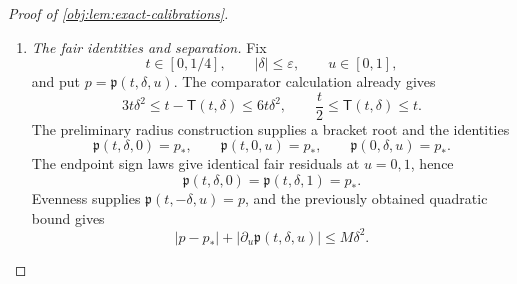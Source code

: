 \documentclass[11pt]{article}
\begin{document}
\begin{proof}[Proof of \cref{obj:lem:exact-calibrations}]
\begin{enumerate}
On the axes, the zero-effect normalized formula and \(EZ_u^2=1\) reduce the residuals to
\[
\mathcal F_{\mathrm{mix}}(0,\zeta,u,\chi)
=1-4\zeta^2-\chi,
\qquad
\mathcal F_{\mathrm{mix}}(\eta,0,u,\chi)
=1-4\eta^2\chi^2-\chi.
\]
When \(|\zeta|\le1/8\), the candidate \(1-4\zeta^2\) lies strictly in \((3/4,5/4)\); the affine equation forces every selected zero to equal it. Hence
\[
\mathfrak q(0,\zeta,u)=1-4\zeta^2.
\]
For the other axis, \(\eta^2\le1/64\) gives
\[
1-4\eta^2(7/8)^2-\frac78\ge0,
\qquad
1-4\eta^2-1\le0.
\]
The intermediate value theorem supplies a zero in \([7/8,1]\), hence in the selection bracket. Substitution of the selected zero into the reduced equation proves
\[
\mathfrak q(\eta,0,u)
+4\eta^2\mathfrak q(\eta,0,u)^2=1.
\]
These arguments include \(\eta=0\) and \(\zeta=0\).

\item \emph{The fair identities and separation.}
Fix
\[
t\in[0,1/4],\qquad |\delta|\le\varepsilon,\qquad u\in[0,1],
\]
and put \(p=\mathfrak p(t,\delta,u)\). The comparator calculation already gives
\[
3t\delta^2\le t-\mathsf T(t,\delta)\le6t\delta^2,
\qquad
\frac t2\le\mathsf T(t,\delta)\le t.
\]
The preliminary radius construction supplies a bracket root and the identities
\[
\mathfrak p(t,\delta,0)=p_*,
\qquad
\mathfrak p(t,0,u)=p_*,
\qquad
\mathfrak p(0,\delta,u)=p_*.
\]
The endpoint sign laws give identical fair residuals at \(u=0,1\), hence
\[
\mathfrak p(t,\delta,0)=\mathfrak p(t,\delta,1)=p_*.
\]
Evenness supplies \(\mathfrak p(t,-\delta,u)=p\), and the previously obtained quadratic bound gives
\[
|p-p_*|+|\partial_u\mathfrak p(t,\delta,u)|
\le M\delta^2.
\]


\end{enumerate}
\end{proof}
\end{document}
